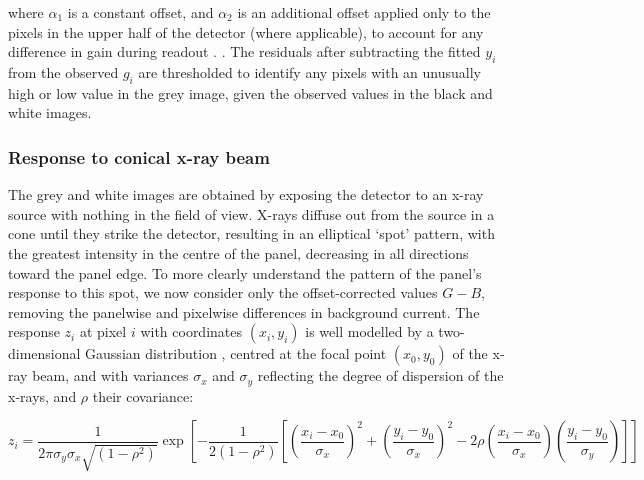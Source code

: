 \documentclass[\main/IO-Pixels.tex]{subfiles}
\begin{document}
where $\alpha_1$ is a constant offset, and $\alpha_2$ is an additional offset applied only to the pixels in the upper half of the detector (where applicable), to account for any difference in gain during readout . . The residuals after subtracting the fitted $y_i$ from the observed $g_i$ are thresholded to identify any pixels with an unusually high or low value in the grey image, given the observed values in the black and white images.



\subsubsection{Response to conical x-ray beam}

The grey and white images are obtained by exposing the detector to an x-ray source with nothing in the field of view. X-rays diffuse out from the source in a cone until they strike the detector, resulting in an elliptical `spot' pattern, with the greatest intensity in the centre of the panel, decreasing in all directions toward the panel edge. To more clearly understand the pattern of the panel's response to this spot, we now consider only the offset-corrected values $G-B$, removing the panelwise and pixelwise differences in background current. The response $z_i$ at pixel $i$ with coordinates $(x_i, y_i)$ is well modelled by a two-dimensional Gaussian distribution , centred at the focal point $(x_0, y_0)$ of the x-ray beam, and with variances $\sigma_x$ and $\sigma_y$ reflecting the degree of dispersion of the x-rays, and $\rho$ their covariance:

\begin{equation}
   z_i = \frac{1}{2\pi \sigma_y \sigma_x \sqrt{(1-\rho^2)}} \exp \left[ -\frac{1}{2(1-\rho^2)} \left[ \left(\frac{x_i-x_0}{\sigma_x}\right)^2 + \left(\frac{y_i-y_0}{\sigma_x}\right)^2 - 2\rho\left(\frac{x_i-x_0}{\sigma_x} \right) \left(\frac{y_i-y_0}{\sigma_y} \right) \right] \right]
\end{equation}
\end{document}

